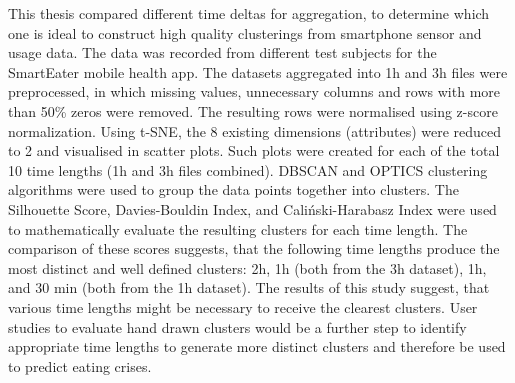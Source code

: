 This thesis compared different time deltas for aggregation, to determine which one is ideal to construct high quality clusterings from smartphone sensor and usage data. The data was recorded from different test subjects for the SmartEater mobile health app. The datasets aggregated into 1h and 3h files were preprocessed, in which missing values, unnecessary columns and rows with more than 50\% zeros were removed. The resulting rows were normalised using z-score normalization. Using t-SNE, the 8 existing dimensions (attributes) were reduced to 2 and visualised in scatter plots. Such plots were created for each of the total 10 time lengths (1h and 3h files combined). DBSCAN and OPTICS clustering algorithms were used to group the data points together into clusters. The Silhouette Score, Davies-Bouldin Index, and Caliński-Harabasz Index were used to mathematically evaluate the resulting clusters for each time length. The comparison of these scores suggests, that the following time lengths produce the most distinct and well defined clusters: 2h, 1h (both from the 3h dataset), 1h, and 30 min (both from the 1h dataset). The results of this study suggest, that various time lengths might be necessary to receive the clearest clusters. User studies to evaluate hand drawn clusters would be a further step to identify appropriate time lengths to generate more distinct clusters and therefore be used to predict eating crises.
